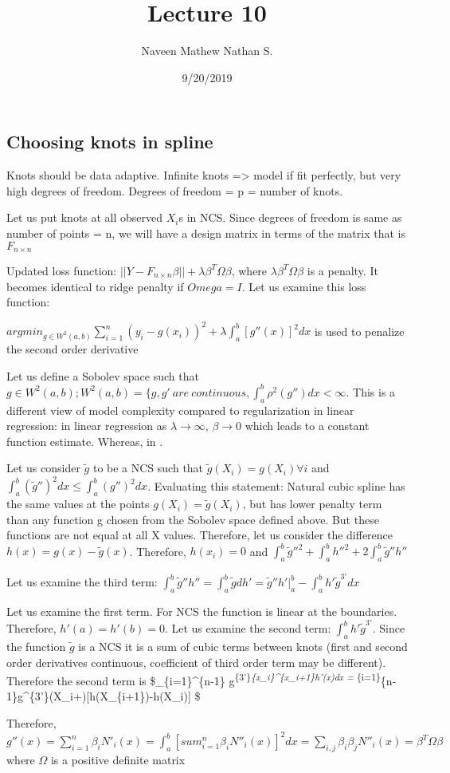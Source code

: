 \documentclass[]{article}
\title{Lecture 10}
\author{Naveen Mathew Nathan S.}
\date{9/20/2019}
\begin{document}
\maketitle

\hypertarget{choosing-knots-in-spline}{%
\subsection{Choosing knots in spline}\label{choosing-knots-in-spline}}

Knots should be data adaptive. Infinite knots =\textgreater{} model if
fit perfectly, but very high degrees of freedom. Degrees of freedom = p
= number of knots.

Let us put knots at all observed \(X_i\)s in NCS. Since degrees of
freedom is same as number of points = n, we will have a design matrix in
terms of the matrix that is \(F_{n\times n}\)

Updated loss function:
\(||Y-F_{n \times n}\beta|| + \lambda \beta^T\Omega\beta\), where
\(\lambda \beta^T\Omega\beta\) is a penalty. It becomes identical to
ridge penalty if \(Omega = I\). Let us examine this loss function:

\(argmin_{g\in W^2(a,b)}\sum_{i=1}^{n} (y_i - g(x_i))^2 + \lambda \int_{a}^{b}[g''(x)]^2 dx\)
is used to penalize the second order derivative

Let us define a Sobolev space such that
\(g \in W^2(a, b); W^2(a, b) = \{g, g'\ are\ continuous, \int_{a}^{b}\rho^2(g'')dx < \infty\).
This is a different view of model complexity compared to regularization
in linear regression: in linear regression as \(\lambda \to \infty\),
\(\beta \to 0\) which leads to a constant function estimate. Whereas, in
.

Let us consider \(\tilde g\) to be a NCS such that
\(\tilde g(X_i) = g(X_i) \forall i\) and
\(\int_{a}^{b} (\tilde g'')^2 dx \le \int_{a}^{b} (g'')^2 dx\).
Evaluating this statement: Natural cubic spline has the same values at
the points \(g(X_i) = \tilde g(X_i)\), but has lower penalty term than
any function g chosen from the Sobolev space defined above. But these
functions are not equal at all X values. Therefore, let us consider the
difference \(h(x) = g(x) - \tilde g(x)\). Therefore, \(h(x_i) = 0\) and
\(\int_a^b \tilde g''^2 + \int_a^bh''^2 + 2\int_a^b \tilde g'' h''\)

Let us examine the third term:
\(\int_a^b \tilde g'' h'' = \int_a^b\tilde gdh' = \tilde g''h'|_a^b - \int_a^b h' \tilde g^{3'}dx\)

Let us examine the first term. For NCS the function is linear at the
boundaries. Therefore, \(h'(a) = h'(b) = 0\). Let us examine the second
term: \(\int_a^b h'\tilde g^{3'}\). Since the function \(\tilde g\) is a
NCS it is a sum of cubic terms between knots (first and second order
derivatives continuous, coefficient of third order term may be
different). Therefore the second term is \$\sum\_\{i=1\}\^{}\{n-1\}
\tilde g\textsuperscript{\{3'\}\int\emph{\{x\_i\}\^{}\{x\_i+1\}h'(x)dx =
\sum}\{i=1\}}\{n-1\}\tilde g\^{}\{3'\}(X\_i+){[}h(X\_\{i+1\})-h(X\_i){]}
\$

Therefore,
\(g''(x) = \sum_{i=1}^{n} \beta_iN'_i(x) = \int_a^b[sum_{i=1}^n \beta_i N''_i(x)]^2dx = \sum_{i,j} \beta_i\beta_j N''_i(x) = \beta^T\Omega\beta\)
where \(\Omega\) is a positive definite matrix
\end{document}
